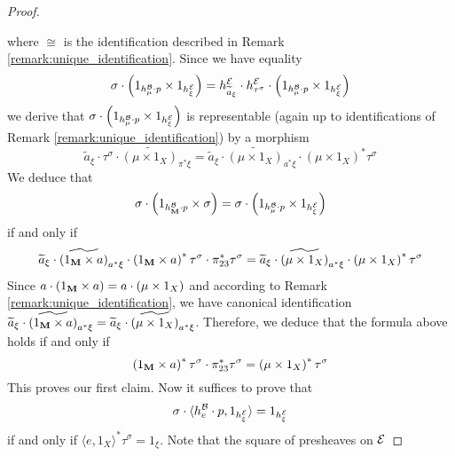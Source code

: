 \begin{proof}
\begin{center}
\end{center}
where $\cong$ is the identification described in Remark \ref{remark:unique_identification}. Since we have equality
$$\sigma \cdot \left(1_{h^{{\mathcal B}}_{\mu}\cdot p} \times 1_{h^{{\mathcal E}}_{\xi}} \right) = h^{{\mathcal E}}_{\widetilde{a}_{\xi}}\cdot h^{{\mathcal E}}_{\tau^{\sigma}}\cdot \left(1_{h^{{\mathcal B}}_{\mu}\cdot p} \times 1_{h^{{\mathcal E}}_{\xi}} \right)$$
we derive that $\sigma \cdot \left(1_{h^{{\mathcal B}}_{\mu}\cdot p} \times 1_{h^{{\mathcal E}}_{\xi}} \right)$ is representable (again up to identifications of Remark \ref{remark:unique_identification}) by a morphism
$$\widetilde{a}_{\xi}\cdot \tau^{\sigma}\cdot \widetilde{\left(\mu\times 1_X\right)}_{\pi^*\xi} = \widetilde{a}_{\xi}\cdot \widetilde{\left(\mu\times 1_X\right)}_{a^*\xi}\cdot \left(\mu\times 1_X\right)^*\tau^{\sigma}$$
We deduce that
$$\sigma \cdot \left(1_{h^{{\mathcal B}}_{\mathbf{M}}\cdot p} \times \sigma \right) = \sigma \cdot \left(1_{h^{{\mathcal B}}_{\mu}\cdot p} \times 1_{h^{{\mathcal E}}_{\xi}} \right)$$
if and only if
$$\widetilde{a}_{\xi} \cdot \widetilde{\left(1_{\mathbf{M}}\times a\right)}_{a^*\xi}\cdot \left(1_{\mathbf{M}}\times a\right)^*\tau^{\sigma}\cdot \pi^*_{23}\tau^\sigma =  \widetilde{a}_{\xi}\cdot \widetilde{\left(\mu\times 1_X\right)}_{a^*\xi}\cdot \left(\mu\times 1_X\right)^*\tau^{\sigma}$$
Since $a\cdot (1_{\mathbf{M}}\times a) = a\cdot (\mu \times 1_X)$ and according to Remark \ref{remark:unique_identification}, we have canonical identification $\widetilde{a}_{\xi} \cdot \widetilde{\left(1_{\mathbf{M}}\times a\right)}_{a^*\xi} = \widetilde{a}_{\xi}\cdot \widetilde{\left(\mu\times 1_X\right)}_{a^*\xi}$. Therefore, we deduce that the formula above holds if and only if
$$\left(1_{\mathbf{M}}\times a\right)^*\tau^{\sigma}\cdot \pi^*_{23}\tau^\sigma = \left(\mu\times 1_X\right)^*\tau^{\sigma}$$
This proves our first claim. Now it suffices to prove that
$$\sigma \cdot \langle h^{{\mathcal B}}_{e}\cdot p, 1_{h^{{\mathcal E}}_{\xi}} \rangle = 1_{h^{{\mathcal E}}_{\xi}}$$
if and only if $\langle e, 1_X\rangle^*\tau^{\sigma} = 1_{\xi}$. Note that the square of presheaves on ${\mathcal E}$

\end{proof}
